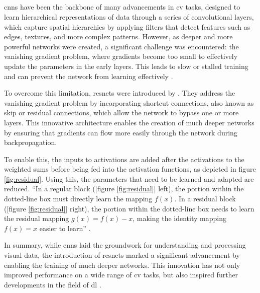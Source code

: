 \subsection{}
\label{subsec:residuals}

\glspl{cnn} have been the backbone of many advancements in \gls{cv} tasks, designed to learn hierarchical representations of data through a series of convolutional layers, which capture spatial hierarchies by applying filters that detect features such as edges, textures, and more complex patterns. However, as deeper and more powerful networks were created, a significant challenge was encountered: the vanishing gradient problem, where gradients become too small to effectively update the parameters in the early layers. This leads to slow or stalled training and can prevent the network from learning effectively \autocite{He.Zhang.ea2016,Zhang.Lipton.ea2023}.

To overcome this limitation, \glspl{resnet} were introduced by \textcite{He.Zhang.ea2016}. They address the vanishing gradient problem by incorporating shortcut connections, also known as skip or residual connections, which allow the network to bypass one or more layers. This innovative architecture enables the creation of much deeper networks by ensuring that gradients can flow more easily through the network during backpropagation. 

To enable this, the inputs to activations are added after the activations to the weighted sums before being fed into the activation functions, as depicted in figure \ref{fig:residual}. Using this, the parameters that need to be learned and adapted are reduced. \enquote{In a regular block ([figure \ref{fig:residual}] left), the portion within the dotted-line box must directly learn the mapping \( f(x) \). In a residual block ([figure \ref{fig:residual}] right), the portion within the dotted-line box needs to learn the residual mapping \( g(x) = f(x) - x \), making the identity mapping \( f(x) = x \) easier to learn} \autocite[313]{Zhang.Lipton.ea2023}.

In summary, while \glspl{cnn} laid the groundwork for understanding and processing visual data, the introduction of \glspl{resnet} marked a significant advancement by enabling the training of much deeper networks. This innovation has not only improved performance on a wide range of \gls{cv} tasks, but also inspired further developments in the field of \gls{dl} \autocite{Goodfellow.Bengio.ea2016,Szeliski2022,Zhang.Lipton.ea2023}.

